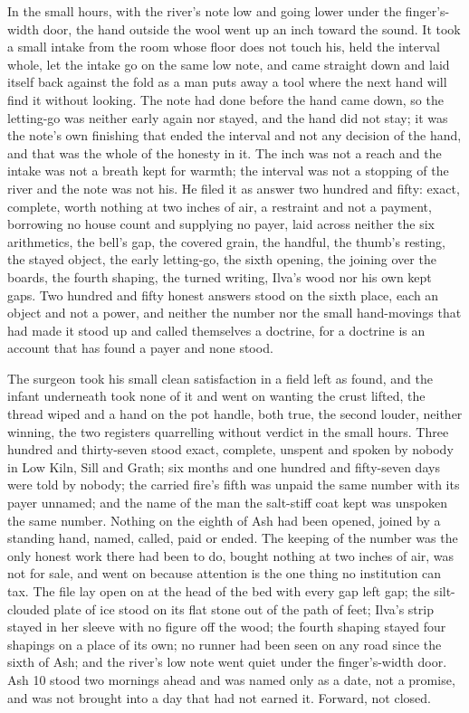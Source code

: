 In the small hours, with the river's note low and going lower under the finger's-width door, the hand outside the wool went up an inch toward the sound. It took a small intake from the room whose floor does not touch his, held the interval whole, let the intake go on the same low note, and came straight down and laid itself back against the fold as a man puts away a tool where the next hand will find it without looking. The note had done before the hand came down, so the letting-go was neither early again nor stayed, and the hand did not stay; it was the note's own finishing that ended the interval and not any decision of the hand, and that was the whole of the honesty in it. The inch was not a reach and the intake was not a breath kept for warmth; the interval was not a stopping of the river and the note was not his. He filed it as answer two hundred and fifty: exact, complete, worth nothing at two inches of air, a restraint and not a payment, borrowing no house count and supplying no payer, laid across neither the six arithmetics, the bell's gap, the covered grain, the handful, the thumb's resting, the stayed object, the early letting-go, the sixth opening, the joining over the boards, the fourth shaping, the turned writing, Ilva's wood nor his own kept gaps. Two hundred and fifty honest answers stood on the sixth place, each an object and not a power, and neither the number nor the small hand-movings that had made it stood up and called themselves a doctrine, for a doctrine is an account that has found a payer and none stood.

The surgeon took his small clean satisfaction in a field left as found, and the infant underneath took none of it and went on wanting the crust lifted, the thread wiped and a hand on the pot handle, both true, the second louder, neither winning, the two registers quarrelling without verdict in the small hours. Three hundred and thirty-seven stood exact, complete, unspent and spoken by nobody in Low Kiln, Sill and Grath; six months and one hundred and fifty-seven days were told by nobody; the carried fire's fifth was unpaid the same number with its payer unnamed; and the name of the man the salt-stiff coat kept was unspoken the same number. Nothing on the eighth of Ash had been opened, joined by a standing hand, named, called, paid or ended. The keeping of the number was the only honest work there had been to do, bought nothing at two inches of air, was not for sale, and went on because attention is the one thing no institution can tax. The file lay open on  at the head of the bed with every gap left gap; the silt-clouded plate of ice stood on its flat stone out of the path of feet; Ilva's strip stayed in her sleeve with no figure off the wood; the fourth shaping stayed four shapings on a place of its own; no runner had been seen on any road since the sixth of Ash; and the river's low note went quiet under the finger's-width door. Ash 10 stood two mornings ahead and was named only as a date, not a promise, and was not brought into a day that had not earned it. Forward, not closed.
